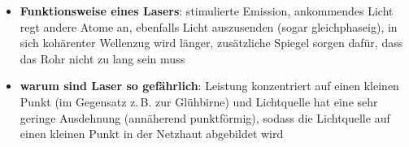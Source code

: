 \linie
\begin{itemize}
    \item
    \textbf{Funktionsweise eines Lasers}:
    stimulierte Emission, ankommendes Licht regt andere Atome an,
    ebenfalls Licht auszusenden (sogar gleichphaseig),
    in sich kohärenter Wellenzug wird länger,
    zusätzliche Spiegel sorgen dafür, dass das Rohr nicht zu lang sein muss
    
    \item
    \textbf{warum sind Laser so gefährlich}:
    Leistung konzentriert auf einen kleinen Punkt (im Gegensatz z.\,B.
    zur Glühbirne) und
    Lichtquelle hat eine sehr geringe Ausdehnung (annäherend punktförmig),
    sodass die Lichtquelle auf einen kleinen Punkt in der Netzhaut abgebildet
    wird
\end{itemize}

\pagebreak
